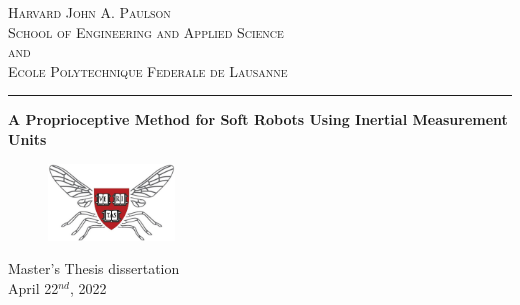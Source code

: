 

\begin{titlepage}
	\centering
	\textsc{\Large Harvard John A. Paulson}\\[0.5 cm]				%
	\textsc{\Large School of Engineering and Applied Science}\\[0.5 cm]				%
    \textsc{and}
	\vspace{0.75cm} \\
	\textsc{\Large Ecole Polytechnique Federale de Lausanne}\\[0.5 cm]	
    \rule{5cm}{0.025cm}
    
	\vspace*{0.5 cm}
	
	{ \huge \bfseries A Proprioceptive Method for Soft Robots Using Inertial Measurement Units \\[0.1 cm]}
	
	\centering
	\begin{figure}[ht!]
	    \centering
        \includegraphics[width=0.3\textwidth]{Docslatex/logo_HMRL.png}
	    \label{fig:my_label}
	\end{figure}


	
		{\large Master's Thesis dissertation  \\ \vspace{0.3cm} April 22$^{nd}$, 2022}\\[2 cm]
		

\end{titlepage}
